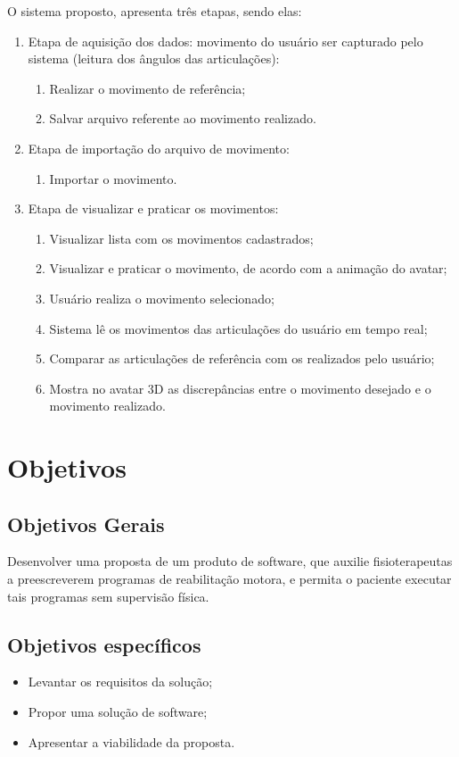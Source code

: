   O sistema proposto, apresenta três etapas, sendo elas:
  \begin{enumerate}
  \item Etapa de aquisição dos dados: movimento do usuário ser capturado pelo sistema (leitura dos ângulos das articulações):
    \begin{enumerate}
    \item Realizar o movimento de referência;
    \item Salvar arquivo referente ao movimento realizado.
    \end{enumerate}
  \item Etapa de importação do arquivo de movimento:
  \begin{enumerate}
      \item Importar o movimento.
  \end{enumerate}
  \item Etapa de visualizar e praticar os movimentos:
    \begin{enumerate}
    \item Visualizar lista com os movimentos cadastrados;
    \item Visualizar e praticar o movimento, de acordo com a animação do avatar;
    \item Usuário realiza o movimento selecionado;
    \item Sistema lê os movimentos das articulações do usuário em tempo real;
    \item Comparar as articulações de referência com os realizados pelo usuário;
    \item Mostra no avatar 3D as discrepâncias entre o movimento desejado e o movimento realizado.
    \end{enumerate}
  \end{enumerate}
\section{Objetivos}
\label{Sec:Objetivos}
\subsection{Objetivos Gerais}
\label{Sub:ObjetivosGerais}
  Desenvolver uma proposta de um produto de software,
  que auxilie fisioterapeutas a preescreverem programas de reabilitação motora,
   e permita o paciente executar tais programas sem supervisão física.
\subsection{Objetivos específicos}
\label{Sub:ObjetivosEspecificos}
\begin{itemize}

\item Levantar os requisitos da solução;
\item Propor uma solução de software;
\item Apresentar a viabilidade da proposta.

\end{itemize}

